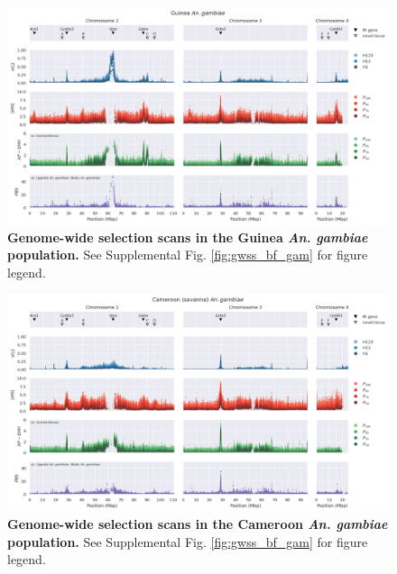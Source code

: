 \documentclass[a4paper,11pt,abstracton,hidelinks]{scrartcl}
\begin{document}
\begin{landscape}
\begin{figure}[t!]
	\begin{center}
		\includegraphics*[width=1\linewidth,center]{artwork/gwss_gn_gam_gw_ug_gam_gq_gam.png}
	\end{center}
	\caption{
	\textbf{Genome-wide selection scans in the Guinea \textit{An. gambiae} population.} 
	See Supplemental Fig. \ref{fig:gwss_bf_gam} for figure legend.
	} 
	\label{fig:gwss_gn_gam}
\end{figure}


\begin{figure}[t!]
	\begin{center}
		\includegraphics*[width=1\linewidth,center]{artwork/gwss_cm_sav_gam_gw_ug_gam_gq_gam.png}
	\end{center}
	\caption{
	\textbf{Genome-wide selection scans in the Cameroon \textit{An. gambiae} population.} 
	See Supplemental Fig. \ref{fig:gwss_bf_gam} for figure legend.
	} 
	\label{fig:gwss_cm_sav_gam}
\end{figure}



\end{landscape}
\end{document}

